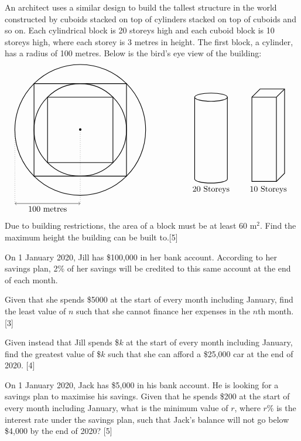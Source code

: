 \documentclass[12pt, a4 paper]{article}
\begin{document}
\begin{outline}[enumerate]
  \2 An architect uses a similar design to build the tallest structure in the world constructed by cuboids stacked on top of cylinders stacked on top of cuboids and so on. Each cylindrical block is 20 storeys high and each cuboid block is 10 storeys high, where each storey is 3 metres in height. The first block, a cylinder, has a radius of 100 metres. Below is the bird's eye view of the building:
  \[
  \begin{tikzpicture}
    \draw[<->] (-80pt,-90pt) -- (-40pt,-90pt)node[below]{100 metres} -- (0,-90pt);
    \draw[dotted] (-80pt,-90pt) -- (-80pt,0);
    \draw[dotted] (0pt,-90pt) -- (0,0);
    \draw[thick] (0,0) circle (80pt);
    \draw[thick] (56.5685pt,56.5685pt) -- (-56.5685pt,56.5685pt) --(-56.5685pt,-56.5685pt) -- (56.5685pt,-56.5685pt) -- cycle;
    \draw[thick] (0,0) circle (56.5685pt);
    \draw[thick] (40pt,40pt) -- (-40pt,40pt) --(-40pt,-40pt) -- (40pt,-40pt) -- cycle;
    \draw[thick] (160pt,40pt) ellipse (20pt and 5pt);
    \draw[thick] (140pt,40pt) -- (140pt,-60pt) arc (180:360:20pt and 5pt) -- (180pt,40pt);
    \draw[thick] (210pt,40pt) rectangle (240pt,-63pt);
    \draw[thick] (210pt,40pt) -- (220pt,50pt) -- (250pt,50pt) -- (250pt,-53pt) -- (240pt,-63pt);
    \draw[thick] (250pt,50pt) -- (240pt,40pt);
    \draw (160pt,-65pt) node[below]{20 Storeys};
    \draw (230pt,-65pt) node[below]{10 Storeys};
    \node at (0,0) {\textbullet};
  \end{tikzpicture}
  \]
  Due to building restrictions, the area of a block must be at least 60 m\(^2\). Find the maximum height the building can be built to.\hfill[5]

\1 On 1 January 2020, Jill has \$100,000 in her bank account. According to her savings plan, 2\% of her savings will be credited to this same account at the end of each month. %

  \2 Given that she spends \$5000 at the start of every month including January, find the least value of \(n\) such that she cannot finance her expenses in the \(n\)th month.\hfill[3]

  \2 Given instead that Jill spends \$\(k\) at the start of every month including January, find the greatest value of \$\(k\) such that she can afford a \$25,000 car at the end of 2020. \hfill[4]

\1 On 1 January 2020, Jack has \$5,000 in his bank account. He is looking for a savings plan to maximise his savings. Given that he spends \$200 at the start of every month including January, what is the minimum value of \(r\), where \(r\)\% is the interest rate under the savings plan, such that Jack's balance will not go below \$4,000 by the end of 2020? \hfill[5] %

\end{outline}
\end{document}
